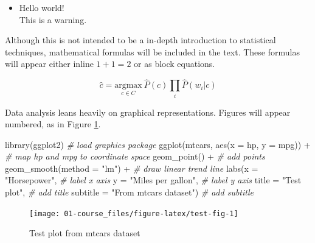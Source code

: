 \documentclass[
]{article}
\newenvironment{Shaded}{\begin{snugshade}}{\end{snugshade}}
\newcommand{\AttributeTok}[1]{\textcolor[rgb]{0.77,0.63,0.00}{#1}}
\newcommand{\CommentTok}[1]{\textcolor[rgb]{0.56,0.35,0.01}{\textit{#1}}}
\newcommand{\FunctionTok}[1]{\textcolor[rgb]{0.00,0.00,0.00}{#1}}
\newcommand{\NormalTok}[1]{#1}
\newcommand{\SpecialCharTok}[1]{\textcolor[rgb]{0.00,0.00,0.00}{#1}}
\newcommand{\StringTok}[1]{\textcolor[rgb]{0.31,0.60,0.02}{#1}}
\newenvironment{rmdblock}[1]
  {\begin{shaded*}
  \begin{itemize}
  \renewcommand{\labelitemi}{
    \raisebox{-.5\height}[0pt][0pt]{
      {\setkeys{Gin}{width=2em,keepaspectratio}\texttt{[image: assets/images/\#1]}}
    }
  }
  \item
  }
  {
  \end{itemize}
  \end{shaded*}
  }
\newenvironment{rmdwarning}
  {\begin{rmdblock}{warning}}
  {\end{rmdblock}}
\begin{document}
\begin{rmdwarning}
Hello world!\\
This is a warning.
\end{rmdwarning}

Although this is not intended to be a in-depth introduction to statistical techniques, mathematical formulas will be included in the text. These formulas will appear either inline \(1 + 1 = 2\) or as block equations.

\begin{equation}
  \hat{c} = \underset{c \in C} {\mathrm{argmax}} ~\hat{P}(c) \prod_i \hat{P}(w_i|c)
  \label{eq:example-formula}
\end{equation}

Data analysis leans heavily on graphical representations. Figures will appear numbered, as in Figure \ref{fig:test-fig}.

\begin{Shaded}
\begin{Highlighting}[]
\FunctionTok{library}\NormalTok{(ggplot2) }\CommentTok{\# load graphics package}
\FunctionTok{ggplot}\NormalTok{(mtcars, }\FunctionTok{aes}\NormalTok{(}\AttributeTok{x =}\NormalTok{ hp, }\AttributeTok{y =}\NormalTok{ mpg)) }\SpecialCharTok{+} \CommentTok{\# map \textquotesingle{}hp\textquotesingle{} and \textquotesingle{}mpg\textquotesingle{} to coordinate space}
  \FunctionTok{geom\_point}\NormalTok{() }\SpecialCharTok{+} \CommentTok{\# add points}
  \FunctionTok{geom\_smooth}\NormalTok{(}\AttributeTok{method =} \StringTok{"lm"}\NormalTok{) }\SpecialCharTok{+} \CommentTok{\# draw linear trend line}
  \FunctionTok{labs}\NormalTok{(}\AttributeTok{x =} \StringTok{"Horsepower"}\NormalTok{, }\CommentTok{\# label x axis}
       \AttributeTok{y =} \StringTok{"Miles per gallon"}\NormalTok{, }\CommentTok{\# label y axis}
       \AttributeTok{title =} \StringTok{"Test plot"}\NormalTok{, }\CommentTok{\# add title}
       \AttributeTok{subtitle =} \StringTok{"From mtcars dataset"}\NormalTok{) }\CommentTok{\# add subtitle}
\end{Highlighting}
\end{Shaded}

\begin{figure}

{\centering \texttt{[image: 01-course\_files/figure-latex/test-fig-1]} 

}

\caption{Test plot from mtcars dataset}\label{fig:test-fig}
\end{figure}
\end{document}
